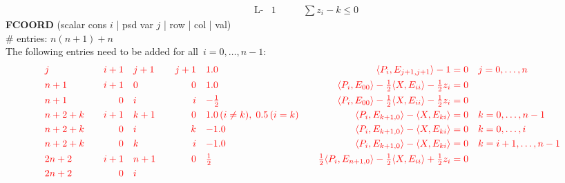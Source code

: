 \documentclass[11pt,a4paper]{article}
\theoremstyle{definition}
\begin{document}
{\[\begin{aligned}
    &\text{L-}  &1 \qquad & \sum z_i - k \leq 0
  \end{aligned}
\]
\textbf{FCOORD} (scalar cons $i$ | psd var $j$ | row | col | val) \\
\# entries: $n(n+1)+n$ \\
{\color{red} The following entries need to be added for all~$i = 0,\dots,n-1$}:
\[
  \begin{aligned}
    &{\color{red}j} \quad &{\color{red}i+1} \quad & {\color{red}j+1} \quad
    & {\color{red}j+1} \quad & {\color{red}1.0} \quad & {\color{red}
      \langle P_i,
      E_{j+1,j+1} \rangle - 1 = 0} \quad & {\color{red} j = 0,\dots,n} \\
    &{\color{red}n+1} \quad &{\color{red}i+1} \quad & {\color{red}0} \quad
    & {\color{red}0} \quad & {\color{red}1.0} \quad & {\color{red} \langle
      P_i, E_{00} \rangle - \tfrac{1}{2}\langle X,E_{ii}\rangle -
      \tfrac{1}{2}z_i = 0} \quad & \\
    &{\color{red}n+1} \quad &{\color{red}0} \quad & {\color{red}i} \quad
    & {\color{red}i} \quad & {\color{red}-\tfrac{1}{2}} \quad & {\color{red} \langle
      P_i, E_{00} \rangle - \tfrac{1}{2}\langle X,E_{ii}\rangle -
      \tfrac{1}{2}z_i = 0} \quad & \\
    &{\color{red}n+2+k} \quad &{\color{red}i+1} \quad & {\color{red}k+1} \quad
    & {\color{red}0} \quad & {\color{red}1.0\, (i\neq k),\; 0.5\, (i=k)} \quad & {\color{red} \langle
      P_i, E_{k+1,0} \rangle - \langle X,E_{ki}\rangle = 0} \quad &
    {\color{red} k = 0,\dots,n-1} \\
    &{\color{red}n+2+k} \quad &{\color{red}0} \quad & {\color{red}i} \quad
    & {\color{red}k} \quad & {\color{red}-1.0} \quad & {\color{red} \langle
      P_i, E_{k+1,0} \rangle - \langle X,E_{ki}\rangle = 0} \quad &
    {\color{red} k = 0,\dots,i} \\
    &{\color{red}n+2+k} \quad &{\color{red}0} \quad & {\color{red}k} \quad
    & {\color{red}i} \quad & {\color{red}-1.0} \quad & {\color{red} \langle
      P_i, E_{k+1,0} \rangle - \langle X,E_{ki}\rangle = 0} \quad &
    {\color{red} k = i+1,\dots,n-1} \\    
    &{\color{red}2n+2} \quad &{\color{red}i+1} \quad & {\color{red}n+1} \quad
    & {\color{red}0} \quad & {\color{red}\tfrac{1}{2}} \quad & {\color{red}
      \tfrac{1}{2}\langle P_i, E_{n+1,0} \rangle - \tfrac{1}{2} \langle
      X,E_{ii}\rangle + \tfrac{1}{2}z_i = 0} \quad & \\
    &{\color{red}2n+2} \quad &{\color{red}0} \quad & {\color{red}i} \quad

\end{aligned}\]}
\end{document}
